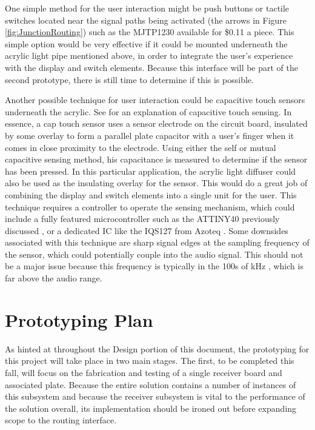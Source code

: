 \documentclass{article}
\begin{document}
		One simple method for the user interaction might be push buttons or tactile switches located near the signal paths being activated (the arrows in Figure \ref{fig:JunctionRouting}) such as the MJTP1230 \cite{MJTP1230datasheet} available for \$0.11 a piece.  This simple option would be very effective if it could be mounted underneath the acrylic light pipe mentioned above, in order to integrate the user's experience with the display and switch elements.  Because this interface will be part of the second prototype, there is still time to determine if this is possible.

		Another possible technique for user interaction could be capacitive touch sensors underneath the acrylic.  See \cite{CypressCapSense} for an explanation of capacitive touch sensing.  In essence, a cap touch sensor uses a sensor electrode on the circuit board, insulated by some overlay to form a parallel plate capacitor with a user's finger when it comes in close proximity to the electrode.  Using either the self or mutual capacitive sensing method, his capacitance is measured to determine if the sensor has been pressed.  In this particular application, the acrylic light diffuser could also be used as the insulating overlay for the sensor.  This would do a great job of combining the display and switch elements into a single unit for the user.  This technique requires a controller to operate the sensing mechanism, which could include a fully featured microcontroller such as the ATTINY40 previously discussed \cite{ATTINY40datasheet}, or a dedicated IC like the IQS127 from Azoteq \cite{IQS127datasheet}.  Some downsides associated with this technique are sharp signal edges at the sampling frequency of the sensor, which could potentially couple into the audio signal.  This should not be a major issue because this frequency is typically in the 100s of kHz \cite{IQS127datasheet}, which is far above the audio range.


\section{Prototyping Plan}
	As hinted at throughout the Design portion of this document, the prototyping for this project will take place in two main stages.  The first, to be completed this fall, will focus on the fabrication and testing of a single receiver board and associated plate.  Because the entire solution contains a number of instances of this subsystem and because the receiver subsystem is vital to the performance of the solution overall, its implementation should be ironed out before expanding scope to the routing interface.
\end{document}
